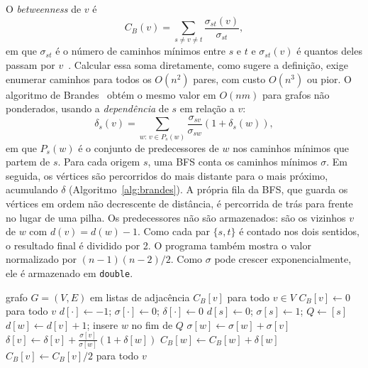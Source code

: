 \documentclass[conference]{IEEEtran}
\begin{document}
O \textit{betweenness} de $v$ é
\begin{equation}
C_B(v) = \sum_{s \neq v \neq t} \frac{\sigma_{st}(v)}{\sigma_{st}},
\end{equation}
em que $\sigma_{st}$ é o número de caminhos mínimos entre $s$ e $t$ e $\sigma_{st}(v)$ é quantos deles passam por $v$~\cite{freeman1977}. Calcular essa soma diretamente, como sugere a definição, exige enumerar caminhos para todos os $O(n^2)$ pares, com custo $O(n^3)$ ou pior. O algoritmo de Brandes~\cite{brandes2001} obtém o mesmo valor em $O(nm)$ para grafos não ponderados, usando a \emph{dependência} de $s$ em relação a $v$:
\begin{equation}
\delta_s(v) = \sum_{w:\, v \in P_s(w)} \frac{\sigma_{sv}}{\sigma_{sw}}\left(1 + \delta_s(w)\right),
\end{equation}
em que $P_s(w)$ é o conjunto de predecessores de $w$ nos caminhos mínimos que partem de $s$. Para cada origem $s$, uma BFS conta os caminhos mínimos $\sigma$. Em seguida, os vértices são percorridos do mais distante para o mais próximo, acumulando $\delta$ (Algoritmo~\ref{alg:brandes}). A própria fila da BFS, que guarda os vértices em ordem não decrescente de distância, é percorrida de trás para frente no lugar de uma pilha. Os predecessores não são armazenados: são os vizinhos $v$ de $w$ com $d(v)=d(w)-1$. Como cada par $\{s,t\}$ é contado nos dois sentidos, o resultado final é dividido por 2. O programa também mostra o valor normalizado por $(n-1)(n-2)/2$. Como $\sigma$ pode crescer exponencialmente, ele é armazenado em \texttt{double}.

\begin{algorithm}[htbp]
\caption{Brandes (grafo não dirigido e não ponderado)}
\label{alg:brandes}
\begin{algorithmic}[1]
\REQUIRE grafo $G=(V,E)$ em listas de adjacência
\ENSURE $C_B[v]$ para todo $v \in V$
\STATE $C_B[v] \leftarrow 0$ para todo $v$
  \STATE $d[\cdot] \leftarrow -1$; $\sigma[\cdot] \leftarrow 0$; $\delta[\cdot] \leftarrow 0$
  \STATE $d[s] \leftarrow 0$; $\sigma[s] \leftarrow 1$; $Q \leftarrow [s]$
        \STATE $d[w] \leftarrow d[v]+1$; insere $w$ no fim de $Q$
      \ENDIF
        \STATE $\sigma[w] \leftarrow \sigma[w] + \sigma[v]$
      \ENDIF
    \ENDFOR
  \ENDFOR
      \STATE $\delta[v] \leftarrow \delta[v] + \frac{\sigma[v]}{\sigma[w]}(1+\delta[w])$
    \ENDFOR
    \STATE $C_B[w] \leftarrow C_B[w] + \delta[w]$
  \ENDFOR
\ENDFOR
\STATE $C_B[v] \leftarrow C_B[v]/2$ para todo $v$
\end{algorithmic}
\end{algorithm}
\end{document}
